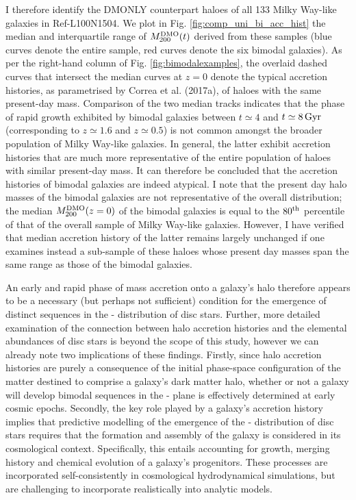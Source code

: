 I therefore identify the DMONLY counterpart haloes of all 133 Milky Way-like galaxies in Ref-L100N1504. We plot in Fig. \ref{fig:comp_uni_bi_acc_hist} the median and interquartile range of $M_{200}^{\rm DMO}(t)$ derived from these samples (blue curves denote the entire sample, red curves denote the six bimodal galaxies). As per the right-hand column of Fig. \ref{fig:bimodalexamples}, the overlaid dashed curves that intersect the median curves at $z=0$ denote the typical accretion histories, as parametrised by Correa et al. (2017a), of haloes with the same present-day mass. Comparison of the two median tracks indicates that the phase of rapid growth exhibited by bimodal galaxies between $t \simeq 4$ and $t \simeq 8\,{\rm Gyr}$ (corresponding to $z \simeq 1.6$ and $z \simeq 0.5$) is not common amongst the broader population of Milky Way-like galaxies. In general, the latter exhibit accretion histories that are much more representative of the entire population of haloes with similar present-day mass. It can therefore be concluded that the accretion histories of bimodal galaxies are indeed atypical. I note that the present day halo masses of the bimodal galaxies are not representative of the overall distribution; the median $M_{200}^{\rm DMO}(z=0)$ of the bimodal galaxies is equal to the $80^{\rm th}$ percentile of that of the overall sample of Milky Way-like galaxies. However, I have verified that median accretion history of the latter remains largely unchanged if one examines instead a sub-sample of these haloes whose present day masses span the same range as those of the bimodal galaxies.


An early and rapid phase of mass accretion onto a galaxy's halo therefore appears to be a necessary (but perhaps not sufficient) condition for the emergence of distinct sequences in the \afe{}-\feh{} distribution of disc stars. Further, more detailed examination of the connection between halo accretion histories and the elemental abundances of disc stars is beyond the scope of this study, however we can already note two implications of these findings. Firstly, since halo accretion histories are purely a consequence of the initial phase-space configuration of the matter destined to comprise a galaxy's dark matter halo, whether or not a galaxy will develop bimodal sequences in the \afe{}-\feh{} plane is effectively determined at early cosmic epochs. Secondly, the key role played by a galaxy's accretion history implies that predictive modelling of the emergence of the \afe{}-\feh{} distribution of disc stars requires that the formation and assembly of the galaxy is considered in its cosmological context. Specifically, this entails accounting for growth, merging history and chemical evolution of a galaxy's progenitors. These processes are incorporated self-consistently in cosmological hydrodynamical simulations, but are challenging to incorporate realistically into analytic models. 

